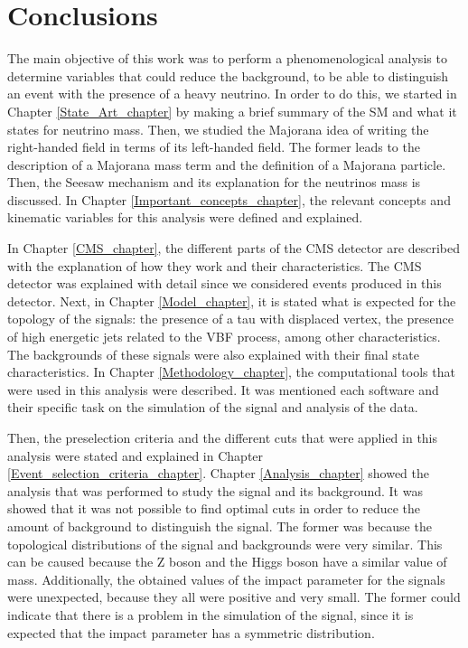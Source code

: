 \chapter{Conclusions} 
\label{Conclusion_chapter}

The main objective of this work was to perform a phenomenological analysis to determine variables that could reduce the background, to be able to distinguish an event with the presence of a heavy neutrino. In order to do this, we started in Chapter \ref{State_Art_chapter} by making a brief summary of the SM and what it states for neutrino mass. Then, we studied the Majorana idea of writing the right-handed field in terms of its left-handed field. The former leads to the description of a Majorana mass term and the definition of a Majorana particle. Then, the Seesaw mechanism and its explanation for the neutrinos mass is discussed. In Chapter \ref{Important_concepts_chapter}, the relevant concepts and kinematic variables for this analysis were defined and explained.

In Chapter \ref{CMS_chapter}, the different parts of the CMS detector are described with the explanation of how they work and their characteristics. The CMS detector was explained with detail since we considered events produced in this detector. Next, in Chapter \ref{Model_chapter}, it is stated what is expected for the topology of the signals: the presence of a tau with displaced vertex, the presence of high energetic jets related to the VBF process, among other characteristics. The backgrounds of these signals were also explained with their final state characteristics. In Chapter \ref{Methodology_chapter}, the computational tools that were used in this analysis were described. It was mentioned each software and their specific task on the simulation of the signal and analysis of the data.  

Then, the preselection criteria and the different cuts that were applied in this analysis were stated and explained in Chapter \ref{Event_selection_criteria_chapter}. Chapter \ref{Analysis_chapter} showed the analysis that was performed to study the signal and its background. It was showed that it was not possible to find optimal cuts in order to reduce the amount of background to distinguish the signal. The former was because the topological distributions of the signal and backgrounds were very similar. This can be caused because the Z boson and the Higgs boson have a similar value of mass. Additionally, the obtained values of the impact parameter for the signals were unexpected, because they all were positive and very small. The former could indicate that there is a problem in the simulation of the signal, since it is expected that the impact parameter has a symmetric distribution.


